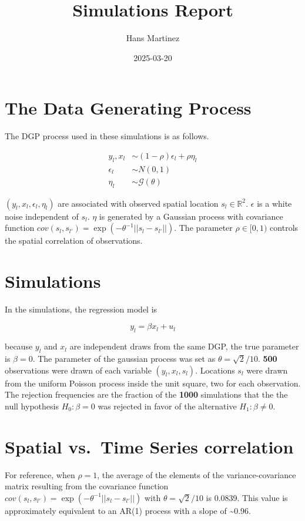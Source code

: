 \documentclass[
]{article}
\title{Simulations Report}
\author{Hans Martinez}
\date{2025-03-20}
\begin{document}
\maketitle

\section{The Data Generating Process}\label{the-data-generating-process}

The DGP process used in these simulations is as follows.

\[
\begin{aligned}
    y_l, x_l &\sim (1-\rho)\epsilon_l +\rho \eta_l \\
    \epsilon_l &\sim N(0,1) \\
    \eta_l &\sim \mathcal{G}(\theta)
\end{aligned}
\]

\((y_l,x_l,\epsilon_l,\eta_l)\) are associated with observed spatial
location \(s_l \in \mathbb{R}^2\). \(\epsilon\) is a white noise
independent of \(s_l\). \(\eta\) is generated by a Gaussian process with
covariance function
\(cov(s_l,s_{l'})=\exp(-\theta^{-1}||s_l-s_{l'}||)\). The parameter
\(\rho\in[0,1)\) controls the spatial correlation of observations.

\section{Simulations}\label{simulations}

In the simulations, the regression model is

\[
    y_l=\beta x_l + u_l
\]

because \(y_l\) and \(x_l\) are independent draws from the same DGP, the
true parameter is \(\beta=0\). The parameter of the gaussian process was
set as \(\theta=\sqrt{2}/10\). \textbf{500} observations were drawn of
each variable \((y_l,x_l,s_l)\). Locations \(s_l\) were drawn from the
uniform Poisson process inside the unit square, two for each
observation. The rejection frequencies are the fraction of the
\textbf{1000} simulations that the the null hypothesis \(H_0: \beta=0\)
was rejected in favor of the alternative \(H_1: \beta\not=0\).

\section{Spatial vs.~Time Series correlation}\label{sec-ar1}

For reference, when \(\rho=1\), the average of the elements of the
variance-covariance matrix resulting from the covariance function
\(cov(s_l,s_{l'})=\exp(-\theta^{-1}||s_l-s_{l'}||)\) with
\(\theta=\sqrt{2}/10\) is 0.0839. This value is approximately equivalent
to an AR(1) process with a slope of \textasciitilde0.96.
\end{document}
